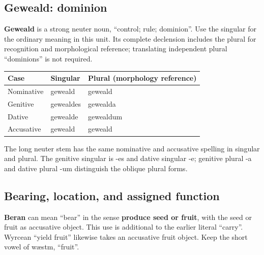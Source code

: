 \subsection*{Geweald: dominion}

\textbf{Geweald} is a strong neuter noun, “control; rule; dominion”. Use the singular for the ordinary meaning in this unit. Its complete declension includes the plural for recognition and morphological reference; translating independent plural “dominions” is not required.

\par\begingroup
\fontsize{10.5}{13.2}\selectfont
\setlength{\LTleft}{0pt}\setlength{\LTright}{\fill}
\noindent
\begin{tabular}{@{}>{\raggedright\arraybackslash}p{39.459mm}>{\raggedright\arraybackslash}p{39.459mm}>{\raggedright\arraybackslash}p{39.459mm}@{}}
\toprule
\textbf{Case} & \textbf{Singular} & \textbf{Plural (morphology reference)} \\
\midrule
Nominative & geweald & geweald \\
Genitive & gewealdes & gewealda \\
Dative & gewealde & gewealdum \\
Accusative & geweald & geweald \\
\bottomrule
\end{tabular}
\par\endgroup
The long neuter stem has the same nominative and accusative spelling in singular and plural. The genitive singular is -es and dative singular -e; genitive plural -a and dative plural -um distinguish the oblique plural forms.

\subsection*{Bearing, location, and assigned function}

\textbf{Beran} can mean “bear” in the sense \textbf{produce seed or fruit}, with the seed or fruit as accusative object. This use is additional to the earlier literal “carry”. Wyrcean “yield fruit” likewise takes an accusative fruit object. Keep the short vowel of wæstm, “fruit”.

